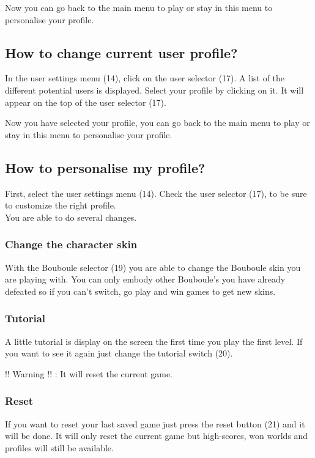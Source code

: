 \documentclass[a4paper,10pt]{report}
\begin{document}
Now you can go back to the main menu to play or stay in this menu to personalise your profile.

	\subsection*{How to change current user profile?}
	
In the user settings menu (14), click on the user selector (17). A list of the different potential users is displayed. Select your profile by clicking on it. It will appear on the top of the user selector (17).

Now you have selected your profile, you can go back to the main menu to play or stay in this menu to personalise your profile.

	\subsection*{How to personalise my profile?}

First, select the user settings menu (14). Check the user selector (17), to be sure to customize the right profile.\\
You are able to do several changes.

		\subsubsection*{Change the character skin}

With the Bouboule selector (19) you are able to change the Bouboule skin you are playing with. You can only embody other Bouboule's you have already defeated so if you can't switch, go play and win games to get new skins.

		\subsubsection*{Tutorial}

A little tutorial is display on the screen the first time you play the first level. If you want to see it again just change the tutorial switch (20).

!! Warning !! : It will reset the current game.

		\subsubsection*{Reset}
		
If you want to reset your last saved game just press the reset button (21) and it will be done. It will only reset the current game but high-scores, won worlds and profiles will still be available.
\end{document}
